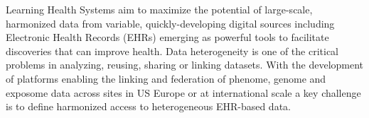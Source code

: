 \documentclass{amia}
\begin{document}
%
%
%

Learning Health Systems aim to maximize the potential of large-scale, harmonized data from variable, quickly-developing digital sources including Electronic Health Records (EHRs) emerging as powerful tools to facilitate discoveries that can improve health. Data heterogeneity is one of the critical problems in analyzing, reusing, sharing or linking datasets. With the development of platforms enabling the linking and federation of phenome, genome and exposome data across sites in US\cite{ref5,ref6} Europe\cite{ref7,ref8} or at international scale\cite{ref9} a key challenge is to define harmonized access to heterogeneous EHR-based data.
\end{document}
